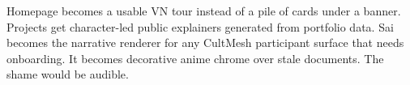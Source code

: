 \ProjectionBand
{Homepage becomes a usable VN tour instead of a pile of cards under a banner.}
{Projects get character-led public explainers generated from portfolio data.}
{Sai becomes the narrative renderer for any CultMesh participant surface that needs onboarding.}
{It becomes decorative anime chrome over stale documents. The shame would be audible.}

